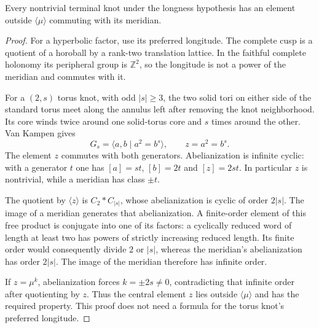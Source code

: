 \begin{lemma}\label{cr:factors}
Every nontrivial terminal knot under the longness hypothesis has an element outside $\langle\mu\rangle$ commuting with its meridian.
\end{lemma}
\begin{proof}
For a hyperbolic factor, use its preferred longitude. The complete cusp is a quotient of a horoball by a rank-two translation lattice. In the faithful complete holonomy its peripheral group is $\mathbb Z^2$, so the longitude is not a power of the meridian and commutes with it.

For a $(2,s)$ torus knot, with odd $|s|\ge3$, the two solid tori on either side of the standard torus meet along the annulus left after removing the knot neighborhood. Its core winds twice around one solid-torus core and $s$ times around the other. Van Kampen gives
\begin{equation}\label{cr:torus-group}
                 G_s=\langle a,b\mid a^2=b^s\rangle,
                       \qquad z=a^2=b^s.
\end{equation}
The element $z$ commutes with both generators. Abelianization is infinite cyclic: with a generator $t$ one has $[a]=s t$, $[b]=2t$ and $[z]=2s t$. In particular $z$ is nontrivial, while a meridian has class $\pm t$.

The quotient by $\langle z\rangle$ is $C_2*C_{|s|}$, whose abelianization is cyclic of order $2|s|$. The image of a meridian generates that abelianization. A finite-order element of this free product is conjugate into one of its factors: a cyclically reduced word of length at least two has powers of strictly increasing reduced length. Its finite order would consequently divide $2$ or $|s|$, whereas the meridian's abelianization has order $2|s|$. The image of the meridian therefore has infinite order.

If $z=\mu^k$, abelianization forces $k=\pm2s\ne0$, contradicting that infinite order after quotienting by $z$. Thus the central element $z$ lies outside $\langle\mu\rangle$ and has the required property. This proof does not need a formula for the torus knot's preferred longitude.
\end{proof}

